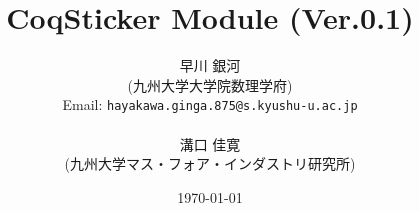 \documentclass{jreport}
\begin{document}
\title{CoqSticker Module (Ver.0.1)}
\author{早川 銀河 \\ (九州大学大学院数理学府)\\
Email: {\tt hayakawa.ginga.875@s.kyushu-u.ac.jp}\\
\ \\
溝口 佳寛 \\ (九州大学マス・フォア・インダストリ研究所)}
\date{\today}

\maketitle

\tableofcontents

  
  
  
  
\end{document}
